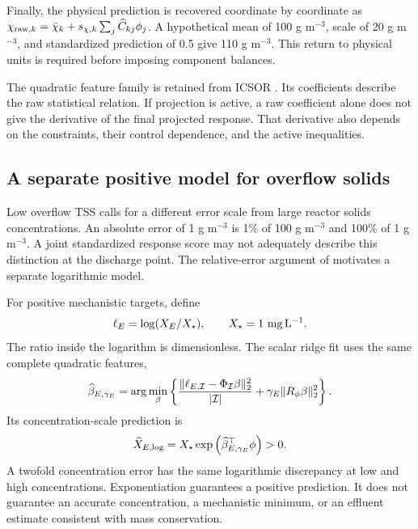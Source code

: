Finally, the physical prediction is recovered coordinate by coordinate as $\chi_{{\rm raw},k}=\bar\chi_k+s_{\chi,k}\sum_j\widehat C_{kj}\phi_j$. A hypothetical mean of 100 g m$^{-3}$, scale of 20 g m$^{-3}$, and standardized prediction of 0.5 give 110 g m$^{-3}$. This return to physical units is required before imposing component balances.

The quadratic feature family is retained from ICSOR \citep{Selerio2026}. Its coefficients describe the raw statistical relation. If projection is active, a raw coefficient alone does not give the derivative of the final projected response. That derivative also depends on the constraints, their control dependence, and the active inequalities.

\subsection{A separate positive model for overflow solids}

Low overflow TSS calls for a different error scale from large reactor solids concentrations. An absolute error of 1 g m$^{-3}$ is 1\% of 100 g m$^{-3}$ and 100\% of 1 g m$^{-3}$. A joint standardized response score may not adequately describe this distinction at the discharge point. The relative-error argument of \citet{Tofallis2015} motivates a separate logarithmic model.

For positive mechanistic targets, define
\begin{equation}
\equationname{Dimensionless logarithmic overflow-solids target}
\ell_E=\log(X_E/X_\star),\qquad X_\star=1\ \mathrm{mg\,L^{-1}}.
\label{eq:plant_log_target}
\end{equation}
The ratio inside the logarithm is dimensionless. The scalar ridge fit uses the same complete quadratic features,
\begin{equation}
\equationname{Ridge fitting problem for the logarithmic overflow model}
\widehat\beta_{E,\gamma_E}=\arg\min_\beta
\left\{\frac{\|\ell_{E,\mathcal I}-\Phi_{\mathcal I}\beta\|_2^2}{|\mathcal I|}
+\gamma_E\|R_\phi\beta\|_2^2\right\}.
\end{equation}
Its concentration-scale prediction is
\begin{equation}
\equationname{Positive overflow-solids prediction from logarithmic back-transformation}
\widehat X_{E,\log}=X_\star\exp\left(\widehat\beta_{E,\gamma_E}^\top\phi\right)>0.
\label{eq:plant_log_prediction}
\end{equation}
A twofold concentration error has the same logarithmic discrepancy at low and high concentrations. Exponentiation guarantees a positive prediction. It does not guarantee an accurate concentration, a mechanistic minimum, or an effluent estimate consistent with mass conservation.

